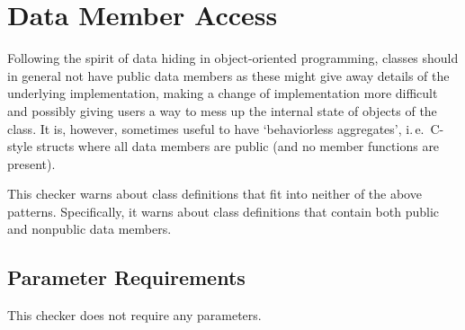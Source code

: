 %
%

\section{Data Member Access}
\label{DataMemberAccess::overview}

Following the spirit of data hiding in object-oriented programming, classes
should in general not have public data members as these might give away
details of the underlying implementation, making a change of implementation
more difficult and possibly giving users a way to mess up the internal state
of objects of the class. It is, however, sometimes useful to have
`behaviorless aggregates', i.\,e.~C-style structs where all data members are
public (and no member functions are present).

This checker warns about class definitions that fit into neither of the above
patterns. Specifically, it warns about class definitions that contain both
public and nonpublic data members.

\subsection{Parameter Requirements}

This checker does not require any parameters.

